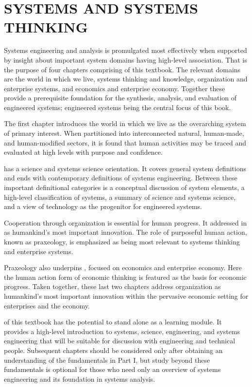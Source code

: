 \part{SYSTEMS AND SYSTEMS THINKING}\label{part:1}

Systems engineering and analysis is promulgated most effectively when supported by insight about important system domains having high-level association.  That is the purpose of four chapters comprising  of this textbook.  The relevant domains are the world in which we live, systems thinking and knowledge, organization and enterprise systems, and economics and enterprise economy. Together these provide a prerequisite foundation for the synthesis, analysis, and evaluation of engineered systems; engineered systems being the central focus of this book.
	
The first chapter introduces the world in which we live as the overarching system of primary interest. When partitioned into interconnected natural, human-made, and human-modified sectors, it is found that human activities may be traced and evaluated at high levels with purpose and confidence.
	
 has a science and systems science orientation.  It covers general system definitions and ends with contemporary definitions of systems engineering.  Between these important definitional categories is a conceptual discussion of system elements, a high-level classification of systems, a summary of science and systems science, and a view of technology as the progenitor for engineered systems.
	
Cooperation through organization is essential for human progress. It addressed in  as humankind’s most important innovation. The role of purposeful human action, known as praxeology, is emphasized as being most relevant to systems thinking and enterprise systems.
	
Praxeology also underpins , focused on economics and enterprise economy.  Here the human action form of economic thinking is featured as the basis for economic progress. Taken together, these last two chapters address organization as humankind’s most important innovation within the pervasive economic setting for enterprises and the economy.

 of this textbook has the potential to stand alone as a learning module.  It provides a high-level introduction to systems, science, engineering, and systems engineering that will be suitable for discussion with engineering and technical people.  Subsequent chapters should be considered only after obtaining an understanding of the fundamentals in Part I, but study beyond these fundamentals is optional for those who need only an overview of systems engineering and its foundation in systems analysis.






